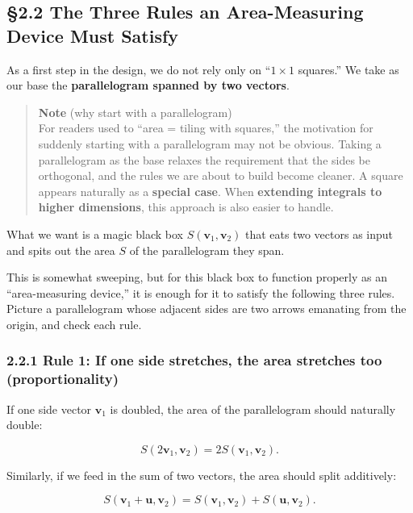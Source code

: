 \documentclass[a4paper,12pt,openany]{book}
\begin{document}
\hypertarget{the-three-rules-an-area-measuring-device-must-satisfy}{%
\subsection{§2.2 The Three Rules an Area-Measuring Device Must
Satisfy}\label{the-three-rules-an-area-measuring-device-must-satisfy}}

As a first step in the design, we do not rely only on ``\(1\times 1\)
squares.'' We take as our base the
\textbf{parallelogram spanned by two vectors}.

\begin{quote}
\textbf{Note} (why start with a parallelogram)\\
For readers used to ``area = tiling with squares,'' the motivation for
suddenly starting with a parallelogram may not be obvious. Taking a
parallelogram as the base relaxes the requirement that the sides be
orthogonal, and the rules we are about to build become cleaner. A square
appears naturally as a \textbf{special case}. When
\textbf{extending integrals to higher dimensions}, this approach is also
easier to handle.
\end{quote}

What we want is a magic black box \(S(\mathbf{v}_1,\mathbf{v}_2)\) that
eats two vectors as input and spits out the area \(S\) of the
parallelogram they span.

This is somewhat sweeping, but for this black box to function properly
as an ``area-measuring device,'' it is enough for it to satisfy the
following three rules. Picture a parallelogram whose adjacent sides are
two arrows emanating from the origin, and check each rule.

\hypertarget{rule-1-if-one-side-stretches-the-area-stretches-too-proportionality}{%
\subsubsection{2.2.1 Rule 1: If one side stretches, the area stretches
too
(proportionality)}\label{rule-1-if-one-side-stretches-the-area-stretches-too-proportionality}}

If one side vector \(\mathbf{v}_1\) is doubled, the area of the
parallelogram should naturally double:

\[S(2\mathbf{v}_1,\mathbf{v}_2)=2S(\mathbf{v}_1,\mathbf{v}_2).\]

Similarly, if we feed in the sum of two vectors, the area should split
additively:

\[S(\mathbf{v}_1+\mathbf{u},\mathbf{v}_2)=S(\mathbf{v}_1,\mathbf{v}_2)+S(\mathbf{u},\mathbf{v}_2).\]
\end{document}
